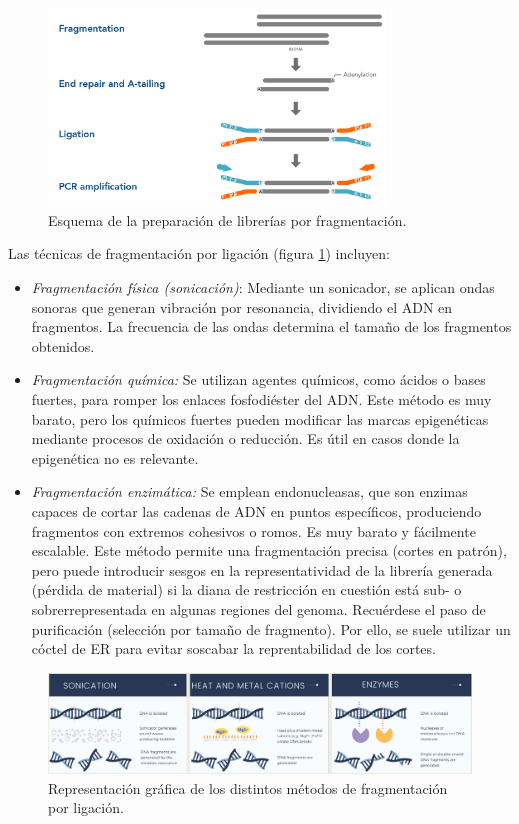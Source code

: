 \begin{itemize}
\begin{figure}[htbp]
\centering
\includegraphics[width = 0.8\textwidth]{figs/19_ng_lib-prep-frag.png}
\caption{Esquema de la preparación de librerías por fragmentación.}
\end{figure}

Las técnicas de fragmentación por ligación (figura \ref{fragmentacion}) incluyen:
\begin{itemize}
\item \textit{Fragmentación física (sonicación)}:
Mediante un sonicador, se aplican ondas sonoras que generan vibración por resonancia, dividiendo el ADN en fragmentos. La frecuencia de las ondas determina el tamaño de los fragmentos obtenidos.
\item \textit{Fragmentación química:}
Se utilizan agentes químicos, como ácidos o bases fuertes, para romper los enlaces fosfodiéster del ADN. Este método es muy barato, pero los químicos fuertes pueden modificar las marcas epigenéticas mediante procesos de oxidación o reducción. Es útil en casos donde la epigenética no es relevante.
\item \textit{Fragmentación enzimática:}
Se emplean endonucleasas, que son enzimas capaces de cortar las cadenas de ADN en puntos específicos, produciendo fragmentos con extremos cohesivos o romos. Es muy barato y fácilmente escalable. Este método permite una fragmentación precisa (cortes en patrón), pero puede introducir sesgos en la representatividad de la librería generada (pérdida de material) si la diana de restricción en cuestión está sub- o sobrerrepresentada en algunas regiones del genoma. Recuérdese el paso de purificación (selección por tamaño de fragmento). Por ello, se suele utilizar un cóctel de ER para evitar soscabar la reprentabilidad de los cortes. 
\end{itemize}

\begin{figure}[htbp]
\centering
\includegraphics[width = \textwidth]{figs/ligation-methods.png}
\caption{Representación gráfica de los distintos métodos de fragmentación por ligación.}
\label{fragmentacion}
\end{figure}


\end{itemize}

